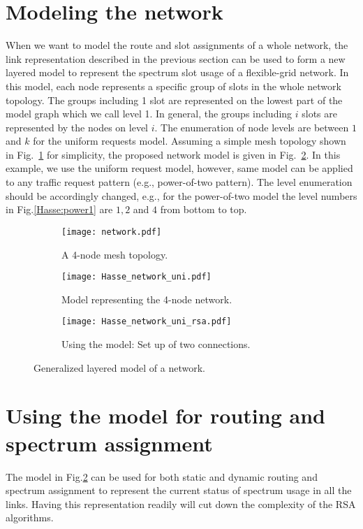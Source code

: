 \documentclass[letterpaper,10pt]{article}\pdfoutput=1
\begin{document}
\section{Modeling the network}
When we want to model the route and slot assignments of a whole network, the link representation 
described in the previous section can be used to form a new layered model to represent the spectrum
slot usage of a flexible-grid network.
In this model, each node represents a specific group of slots in the whole network 
topology. The groups including 1 slot are represented on the lowest part of the model graph which we call
level 1. In general, the groups including $i$ slots are represented by the nodes on level $i$.
The enumeration of node levels are between $1$ and $k$ for the uniform requests model. 
Assuming a simple mesh topology shown in Fig.~\ref{network:4node} for simplicity,
the proposed network model is given in Fig.~\ref{network:model}. In this example, 
we use the uniform request model, however, same model can be applied to any
traffic request pattern (e.g., power-of-two pattern). The level enumeration should be accordingly changed, e.g.,
for the power-of-two model the level numbers in Fig.\ref{Hasse:power1} are $1, 2$ and $4$ from bottom to top. 
\begin{figure}[t]
\centering
\begin{subfigure}{0.10\textwidth}
\centering
\texttt{[image: network.pdf]}
\caption{A 4-node mesh topology.}
\label{network:4node}
\end{subfigure}
\begin{subfigure}{0.44\textwidth}
\centering
\texttt{[image: Hasse\_network\_uni.pdf]}
\caption{Model representing the 4-node network.}
\label{network:model}
\end{subfigure}
\begin{subfigure}{0.44\textwidth}
\centering
\texttt{[image: Hasse\_network\_uni\_rsa.pdf]}
\caption{Using the model: Set up of two connections.}
\label{network:rsa_ex}
\end{subfigure}
\vspace{-0.5cm}
\caption{Generalized layered model of a network.}
\vspace{-0.8cm}
\end{figure}

\section{Using the model for routing and spectrum assignment}
The model in Fig.\ref{network:model} can be used for both static and dynamic routing and spectrum assignment
to represent the current status of spectrum usage in all the links. Having this representation readily will
cut down the complexity of the RSA algorithms.
\end{document}
